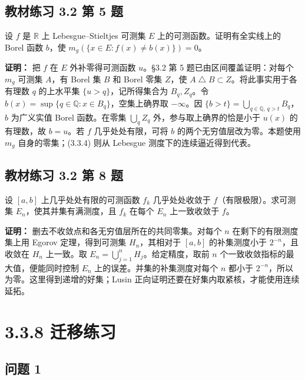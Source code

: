 \documentclass[11pt,a4paper]{article}
\begin{document}
\subsection{教材练习 3.2 第 5
题}\label{ux6559ux6750ux7ec3ux4e60-3.2-ux7b2c-5-ux9898}

设 \(f\) 是 \(\mathbb R\) 上 Lebesgue--Stieltjes 可测集 \(E\)
上的可测函数。证明有全实线上的 Borel 函数 \(b\)，使
\(m_g(\{x\in E:f(x)\ne b(x)\})=0\)。

\textbf{证明：} 把 \(f\) 在 \(E\) 外补零得可测函数 \(u\)。§3.2 第 5
题已由区间覆盖证明：对每个 \(m_g\) 可测集 \(A\)，有 Borel 集 \(B\) 和
Borel 零集 \(Z\)，使
\(A\mathbin\triangle B\subset Z\)。将此事实用于各有理数 \(q\) 的上水平集
\(\{u>q\}\)，记所得集合为 \(B_q,Z_q\)。令
\(b(x)=\sup\{q\in\mathbb Q:x\in B_q\}\)，空集上确界取 \(-\infty\)。因
\(\{b>t\}=\bigcup_{q\in\mathbb Q,\,q>t}B_q\)，\(b\) 为广义实值 Borel
函数。在零集 \(\bigcup_q Z_q\) 外，参与取上确界的恰是小于 \(u(x)\)
的有理数，故 \(b=u\)。若 \(f\) 几乎处处有限，可将 \(b\)
的两个无穷值层改为零。本题使用 \(m_g\) 自身的零集；(3.3.4) 则从 Lebesgue
测度下的连续逼近得到代表。

\subsection{教材练习 3.2 第 8
题}\label{ux6559ux6750ux7ec3ux4e60-3.2-ux7b2c-8-ux9898}

设 \([a,b]\) 上几乎处处有限的可测函数 \(f_k\) 几乎处处收敛于
\(f\)（有限极限）。求可测集 \(E_n\)，使其并集有满测度，且 \(f_k\) 在每个
\(E_n\) 上一致收敛于 \(f\)。

\textbf{证明：} 删去不收敛点和各无穷值层所在的共同零集。对每个 \(n\)
在剩下的有限测度集上用 Egorov 定理，得到可测集 \(H_n\)，其相对于
\([a,b]\) 的补集测度小于 \(2^{-n}\)，且收敛在 \(H_n\) 上一致。取
\(E_n=\bigcup_{j=1}^n H_j\)。给定精度，取前 \(n\)
个一致收敛指标的最大值，便能同时控制 \(E_n\)
上的误差。并集的补集测度对每个 \(n\) 都小于
\(2^{-n}\)，所以为零。这里得到递增的好集；Lusin
正向证明还要在好集内取紧核，才能使用连续延拓。

\clearpage\section[\S{}3.3.8 迁移练习]{3.3.8 迁移练习}\label{ux8fc1ux79fbux7ec3ux4e60}

\subsection{问题 1}\label{ux95eeux9898-1}
\end{document}
